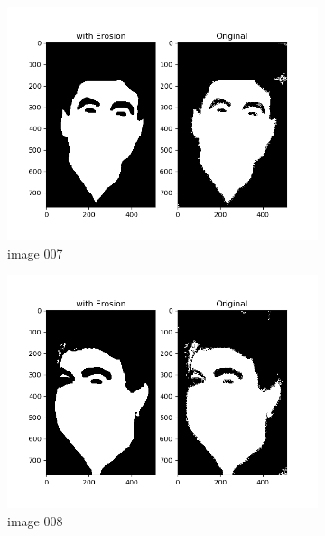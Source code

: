 \documentclass[11pt]{report}
\begin{document}
\begin{figure}[H]
\begin{subfigure}{0.3\textwidth}
        \includegraphics[width=\textwidth]{Task 2 Plots/bin_mask_erode_007.png}
        \caption{image 007}
        \label{fig:binmask_erode7}
    \end{subfigure}
    \begin{subfigure}{0.3\textwidth}
        \centering
        \includegraphics[width=\textwidth]{Task 2 Plots/bin_mask_erode_008.png}
        \caption{image 008}
        \label{fig:binmask_erode8}
    \end{subfigure}
    \begin{subfigure}{0.3\textwidth}
        \centering

\end{subfigure}
\end{figure}
\end{document}
